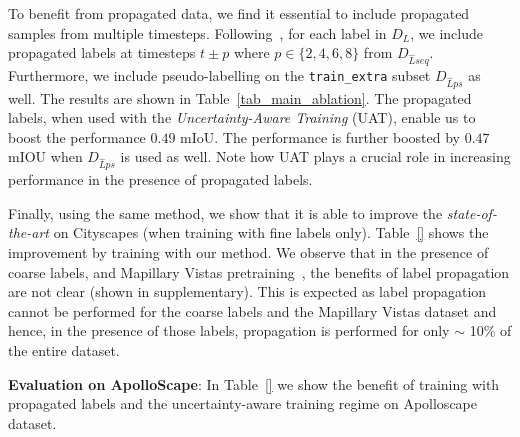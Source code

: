 \let\clearpage\relax

\let\clearpage\relax

% 


To benefit from propagated data, we find it essential to include propagated samples from multiple timesteps. Following~\cite{lp_eccv}, for each label in $D_L$, we include propagated labels at timesteps $t \pm p$ where $p \in \{2,4,6,8\}$ from $D_{\hat{L}seq}$. Furthermore, we include pseudo-labelling on the \texttt{train\_extra} subset $D_{\hat{L}ps}$ as well. The results are shown in Table~\ref{tab_main_ablation}. The propagated labels, when used with the \emph{Uncertainty-Aware Training} (UAT), enable us to boost the performance $0.49$ mIoU. The performance is further boosted by $0.47$ mIOU when $D_{\hat{L}ps}$ is used as well. Note how UAT plays a crucial role in increasing performance in the presence of propagated labels.

Finally, using the same method, we show that it is able to improve the \textit{state-of-the-art} on Cityscapes (when training with fine labels only). Table~\ref{} shows the improvement by training with our method. We observe that in the presence of coarse labels, and Mapillary Vistas pretraining~\cite{mapillary}, the benefits of label propagation are not clear (shown in supplementary). This is expected as label propagation cannot be performed for the coarse labels and the Mapillary Vistas dataset and hence, in the presence of those labels, propagation is performed for only $\sim$ 10\% of the entire dataset.



\textbf{Evaluation on ApolloScape}: In Table~\ref{} we show the benefit of training with propagated labels and the uncertainty-aware training regime on Apolloscape dataset. %

